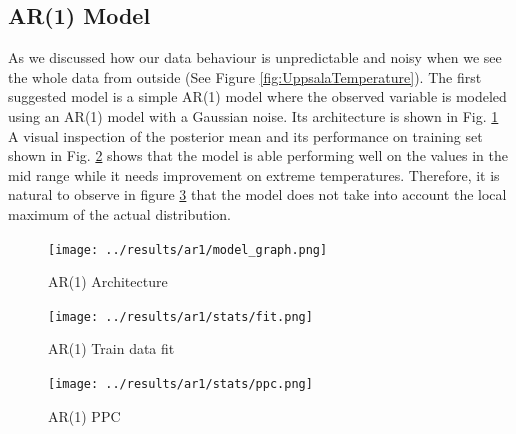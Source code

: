 \documentclass{IEEEtran}
\begin{document}
  \subsection{AR(1) Model}
  As we discussed how our data behaviour is unpredictable and noisy when we see the whole data from outside (See Figure \ref{fig:UppsalaTemperature}). The first suggested model is a simple AR(1) model where the observed variable is modeled using an AR(1) model with a Gaussian noise. Its architecture is shown in Fig. \ref{fig:ar1_model}  A visual inspection of the posterior mean and its performance on training set shown in Fig. \ref{fig:ar1_fit} shows that the model is able performing well on the values in the mid range while it needs improvement on extreme temperatures. Therefore, it is natural to observe in figure \ref{fig:ar1_ppc} that the model does not take into account the local maximum of the actual distribution. 

  \begin{figure}
    \begin{center}
      \texttt{[image: ../results/ar1/model\_graph.png]}
    \end{center}
    \caption{AR(1) Architecture}\label{fig:ar1_model}
  \end{figure}
  \begin{figure}
    \begin{center}
      \texttt{[image: ../results/ar1/stats/fit.png]}
    \end{center}
    \caption{AR(1) Train data fit}\label{fig:ar1_fit}
  \end{figure}
  \begin{figure}
    \texttt{[image: ../results/ar1/stats/ppc.png]}
    \caption{AR(1) PPC}\label{fig:ar1_ppc}
  \end{figure}
\end{document}
